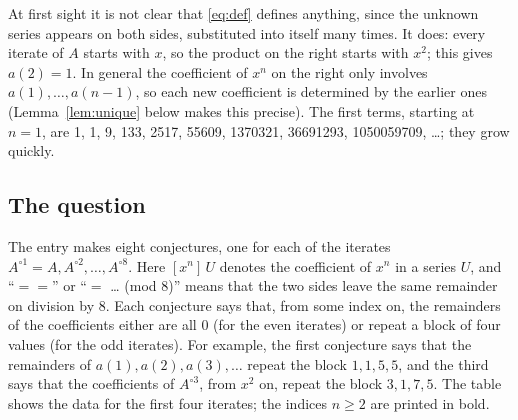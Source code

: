 \documentclass[11pt,a4paper]{article}
\theoremstyle{definition}
\theoremstyle{remark}
\begin{document}
At first sight it is not clear that \eqref{eq:def} defines anything, since the unknown series appears on both sides,
substituted into itself many times. It does: every iterate
of $A$ starts with $x$, so the product on the right starts with $x^2$; this gives $a(2)=1$. In general the
coefficient of $x^n$ on the right only involves $a(1),\dots,a(n-1)$, so each new coefficient is determined by the
earlier ones (Lemma~\ref{lem:unique} below makes this precise). The first terms, starting at $n=1$, are
1, 1, 9, 133, 2517, 55609, 1370321, 36691293, 1050059709, \dots; they grow quickly.

\subsection{The question}
The entry makes eight conjectures, one for each of the iterates $A^{\circ1}=A,A^{\circ2},\dots,A^{\circ8}$.
Here $[x^n]\,U$ denotes the coefficient of $x^n$ in a series $U$, and ``$==$'' or ``$=$ \dots{} (mod 8)'' means that
the two sides leave the same remainder on division by $8$. Each conjecture says that, from some index on, the
remainders of the coefficients either are all $0$ (for the even iterates) or repeat a block of four values (for the
odd iterates). For example, the first conjecture says that the remainders of $a(1),a(2),a(3),\dots$ repeat the block
$1,1,5,5$, and the third says that the coefficients of $A^{\circ3}$, from $x^2$ on, repeat the block $3,1,7,5$. The
table shows the data for the first four iterates; the indices $n\ge2$ are printed in bold.
\end{document}
